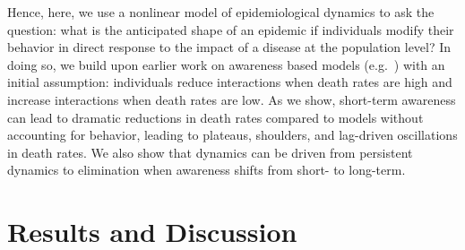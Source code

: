 Hence, here, we use a nonlinear model of epidemiological dynamics to
ask the question: what is the anticipated
shape of an epidemic if individuals modify their behavior in direct
response to the impact of a disease at the population level? In doing so,
we build upon earlier work on awareness based models (e.g.~\citep{funk2009spread,funk2010modelling,eksin2017disease, eksin2019systematic}) with an
initial assumption: individuals reduce interactions when 
death rates are high and increase interactions when death rates are low.  
As we show, short-term awareness can lead to dramatic reductions
in death rates compared to models without accounting for behavior,
leading to plateaus, shoulders,
and lag-driven oscillations in death rates. We also show that dynamics
can be driven from persistent dynamics to elimination when
awareness shifts from short- to long-term.


\section{Results and Discussion}
